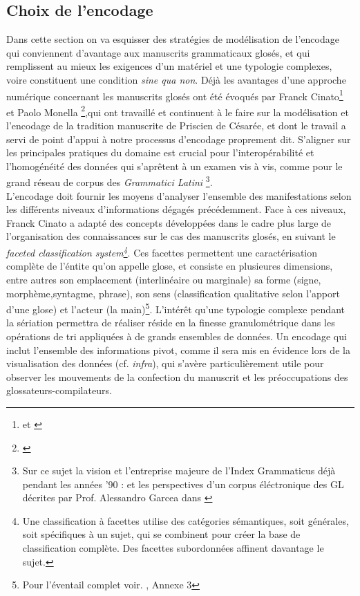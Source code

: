 \documentclass[a4paper, twoside, 12pt]{book}
\begin{document}
\subsection{Choix de l'encodage}

Dans cette section on va esquisser des stratégies de modélisation de l'encodage qui conviennent d'avantage aux manuscrits grammaticaux glosés, et qui remplissent au mieux les exigences d’un matériel et une typologie complexes, voire constituent une condition \textit{sine qua non}. Déjà les avantages d'une approche numérique concernant les manuscrits glosés ont été évoqués par Franck Cinato\footnote{\cite{cinato2015priscien} et \cite{cinato2011perspectives}} et Paolo Monella \footnote{\cite{monella2019digital}},qui ont travaillé et continuent à le faire sur la modélisation et l'encodage de la tradition manuscrite de Priscien de Césarée, et dont le travail a servi de point d'appui à notre processus d'encodage proprement dit. S'aligner sur les principales pratiques du domaine est crucial pour l'interopérabilité et l'homogénéité des données qui s'aprêtent à un examen vis à vis, comme pour le grand réseau de corpus des \textit{Grammatici Latini} \footnote{ Sur ce sujet la vision et l'entreprise majeure de l'Index Grammaticus déjà pendant les années '90 : \cite{lomanto1990index} et les perspectives d'un corpus éléctronique des GL décrites par Prof. Alessandro Garcea dans \cite{garcea2010corpus}}.\\

L'encodage doit fournir les moyens d’analyser l’ensemble des manifestations selon les différents niveaux d’informations dégagés précédemment. Face à ces niveaux, Franck Cinato a adapté des concepts développées dans le cadre plus large de l’organisation des connaissances sur le cas des manuscrits glosés, en suivant le \textit{faceted classification system\footnote{Une classification à facettes utilise des catégories sémantiques, soit générales, soit spécifiques à un sujet, qui se combinent pour créer la base de classification complète. Des facettes subordonnées affinent davantage le sujet.}}. Ces facettes permettent une caractérisation complète de l'éntite qu'on appelle glose, et consiste en plusieures dimensions, entre autres son emplacement (interlinéaire ou marginale) sa forme (signe, morphème,syntagme, phrase), son sens (classification qualitative selon l'apport d'une glose) et l'acteur (la main)\footnote{Pour l'éventail complet voir. \cite{cinato2015priscien}, Annexe 3}. L’intérêt qu’une  typologie complexe pendant la sériation permettra de réaliser réside en la  \og{}finesse granulométrique\fg{} dans les opérations de tri appliquées à de grands ensembles de données. Un encodage qui inclut l'ensemble des informations pivot, comme il sera mis en évidence lors de la visualisation des données (cf. \textit{infra}), qui s'avère particulièrement utile pour observer les mouvements de la confection du manuscrit et les préoccupations des glossateurs-compilateurs.\\
\end{document}
